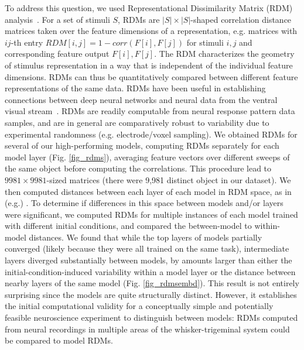 To address this question, we used Representational Dissimilarity Matrix (RDM) analysis~\cite{Kriegeskorte2008}.
For a set of stimuli $S$, RDMs are $|S| \times |S|$-shaped correlation distance matrices taken over the feature dimensions of a representation, e.g. matrices with $ij$-th entry $RDM[i, j] = 1 - corr(F[i], F[j])$ for stimuli $i, j$ and corresponding feature output $F[i], F[j]$.
The RDM characterizes the geometry of stimulus representation in a way that is independent of the individual feature dimensions.  RDMs can thus be quantitatively compared between different feature representations of the same data.
RDMs have been useful in establishing connections between deep neural networks and neural data from the ventral visual stream~\cite{cadieu2014deep, Yamins2014, khaligh2014deep}. 
RDMs are readily computable from neural response pattern data samples, and are in general are comparatively robust to variability due to experimental randomness (e.g. electrode/voxel sampling).
We obtained RDMs for several of our high-performing models, computing RDMs separately for each model layer (Fig. \ref{fig_rdms}), averaging feature vectors over different sweeps of the same object before computing the correlations.
This procedure lead to $9981\times9981$-sized matrices (there were 9,981 distinct object in our dataset).
We then computed distances between each layer of each model in RDM space, as in (e.g.) \cite{khaligh2014deep}.
To determine if differences in this space between models and/or layers were significant, we computed RDMs for multiple instances of each model trained with different initial conditions, and compared the between-model to within-model distances.
We found that while the top layers of models partially converged (likely because they were all trained on the same task), intermediate layers diverged substantially between models, by amounts larger than either the initial-condition-induced variability within a model layer or the distance between nearby layers of the same model (Fig. \ref{fig_rdmsembd}).
This result is not entirely surprising since the models are quite structurally distinct.  
However, it establishes the initial computational validity for a conceptually simple and potentially feasible neuroscience experiment to distinguish between models: RDMs computed from neural recordings in multiple areas of the whisker-trigeminal system could be compared to model RDMs.

